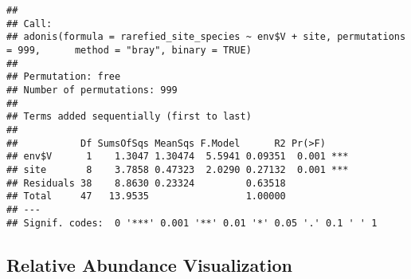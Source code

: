 \documentclass[
]{article}
\newenvironment{Shaded}{\begin{snugshade}}{\end{snugshade}}
\newcommand{\AttributeTok}[1]{\textcolor[rgb]{0.77,0.63,0.00}{#1}}
\newcommand{\ConstantTok}[1]{\textcolor[rgb]{0.00,0.00,0.00}{#1}}
\newcommand{\DecValTok}[1]{\textcolor[rgb]{0.00,0.00,0.81}{#1}}
\newcommand{\FunctionTok}[1]{\textcolor[rgb]{0.00,0.00,0.00}{#1}}
\newcommand{\NormalTok}[1]{#1}
\newcommand{\OtherTok}[1]{\textcolor[rgb]{0.56,0.35,0.01}{#1}}
\newcommand{\SpecialCharTok}[1]{\textcolor[rgb]{0.00,0.00,0.00}{#1}}
\newcommand{\StringTok}[1]{\textcolor[rgb]{0.31,0.60,0.02}{#1}}
\begin{document}
\begin{Shaded}
\end{Shaded}

\begin{verbatim}
## 
## Call:
## adonis(formula = rarefied_site_species ~ env$V + site, permutations = 999,      method = "bray", binary = TRUE) 
## 
## Permutation: free
## Number of permutations: 999
## 
## Terms added sequentially (first to last)
## 
##           Df SumsOfSqs MeanSqs F.Model      R2 Pr(>F)    
## env$V      1    1.3047 1.30474  5.5941 0.09351  0.001 ***
## site       8    3.7858 0.47323  2.0290 0.27132  0.001 ***
## Residuals 38    8.8630 0.23324         0.63518           
## Total     47   13.9535                 1.00000           
## ---
## Signif. codes:  0 '***' 0.001 '**' 0.01 '*' 0.05 '.' 0.1 ' ' 1
\end{verbatim}

\hypertarget{relative-abundance-visualization}{%
\subsection{Relative Abundance
Visualization}\label{relative-abundance-visualization}}
\end{document}
